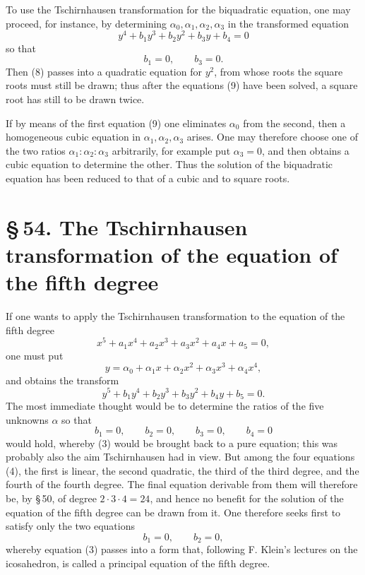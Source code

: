 \documentclass[11pt]{article}
\providecommand{\sect}[2]{\section*{\S\,#1. #2}}
\begin{document}
To use the Tschirnhausen transformation for the biquadratic equation, one may proceed, for instance, by determining $\alpha_0,\alpha_1,\alpha_2,\alpha_3$ in the transformed equation
\begin{equation}
y^4+b_1y^3+b_2y^2+b_3y+b_4=0
\tag{8}
\end{equation}
so that
\begin{equation}
b_1=0,
\qquad
b_3=0.
\tag{9}
\end{equation}
Then (8) passes into a quadratic equation for $y^2$, from whose roots the square roots must still be drawn; thus after the equations (9) have been solved, a square root has still to be drawn twice.

If by means of the first equation (9) one eliminates $\alpha_0$ from the second, then a homogeneous cubic equation in $\alpha_1,\alpha_2,\alpha_3$ arises. One may therefore choose one of the two ratios $\alpha_1:\alpha_2:\alpha_3$ arbitrarily, for example put $\alpha_3=0$, and then obtains a cubic equation to determine the other. Thus the solution of the biquadratic equation has been reduced to that of a cubic and to square roots.

\sect{54}{The Tschirnhausen transformation of the equation of the fifth degree}

If one wants to apply the Tschirnhausen transformation to the equation of the fifth degree
\begin{equation}
x^5+a_1x^4+a_2x^3+a_3x^2+a_4x+a_5=0,
\tag{1}
\end{equation}
one must put
\begin{equation}
y=\alpha_0+\alpha_1x+\alpha_2x^2+\alpha_3x^3+\alpha_4x^4,
\tag{2}
\end{equation}
and obtains the transform
\begin{equation}
y^5+b_1y^4+b_2y^3+b_3y^2+b_4y+b_5=0.
\tag{3}
\end{equation}
The most immediate thought would be to determine the ratios of the five unknowns $\alpha$ so that
\begin{equation}
b_1=0,
\qquad b_2=0,
\qquad b_3=0,
\qquad b_4=0
\tag{4}
\end{equation}
would hold, whereby (3) would be brought back to a pure equation; this was probably also the aim Tschirnhausen had in view. But among the four equations (4), the first is linear, the second quadratic, the third of the third degree, and the fourth of the fourth degree. The final equation derivable from them will therefore be, by \S\,50, of degree $2\cdot3\cdot4=24$, and hence no benefit for the solution of the equation of the fifth degree can be drawn from it. One therefore seeks first to satisfy only the two equations
\begin{equation}
b_1=0,
\qquad b_2=0,
\tag{5}
\end{equation}
whereby equation (3) passes into a form that, following F. Klein's lectures on the icosahedron, is called a principal equation of the fifth degree.
\end{document}
